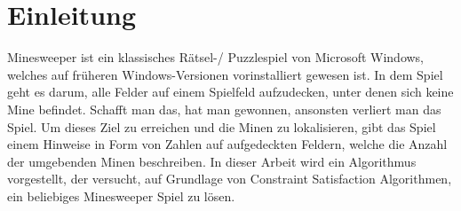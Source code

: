 %

\section{Einleitung}
Minesweeper ist ein klassisches Rätsel-/ Puzzlespiel von Microsoft Windows, welches auf früheren Windows-Versionen
vorinstalliert gewesen ist. In dem Spiel geht es darum, alle Felder auf einem Spielfeld aufzudecken, unter denen
sich keine Mine befindet. Schafft man das, hat man gewonnen, ansonsten verliert man das Spiel. Um dieses Ziel zu
erreichen und die Minen zu lokalisieren, gibt das Spiel einem Hinweise in Form von Zahlen auf aufgedeckten
Feldern, welche die Anzahl der umgebenden Minen beschreiben. In dieser Arbeit wird ein Algorithmus vorgestellt,
der versucht, auf Grundlage von Constraint Satisfaction Algorithmen, ein beliebiges Minesweeper Spiel zu lösen.